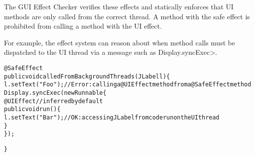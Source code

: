 
The GUI Effect Checker verifies these effects and statically enforces that UI methods are only
called from the correct thread.  A method with the safe effect is prohibited from calling a method
with the UI effect.

For example, the effect system can reason about when method calls must be dispatched to the UI
thread via a message such as \<Display.syncExec>.
\begin{alltt}
@SafeEffect
public void calledFromBackgroundThreads(JLabel l) \{
    l.setText("Foo");       // Error: calling a @UIEffect method from a @SafeEffect method
    Display.syncExec(new Runnable \{
        @UIEffect // inferred by default
        public void run() \{
            l.setText("Bar");  // OK: accessing JLabel from code run on the UI thread
        \}
    \});

\}
\end{alltt}


